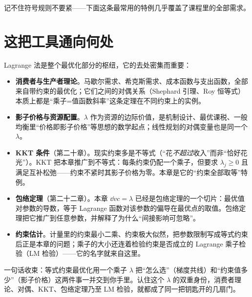 记不住符号规则不要紧——下面这条最常用的特例几乎覆盖了课程里的全部需求。




\section{这把工具通向何处}
\label{sec:lagrange-7}

Lagrange 法是整个最优化部分的枢纽，它的去处密集而重要：

\begin{itemize}
    \item \textbf{消费者与生产者理论}。马歇尔需求、希克斯需求、成本函数与支出函数，全部来自带约束的最优化；它们之间的对偶关系（Shephard 引理、Roy 恒等式）本质上都是``乘子=值函数斜率''这条定理在不同约束上的实例。
    \item \textbf{影子价格与资源配置}。$\lambda$ 作为资源的边际价值，是机制设计、最优课税、一般均衡里``价格即影子价格''等思想的数学起点；线性规划的对偶变量也是同一个 $\lambda$。
    \item \textbf{KKT 条件}（第二十章）。现实约束多是不等式（``花\emph{不超过}收入''而非``恰好花光''）。KKT 把本章推广到不等式：每条约束仍配一个乘子，但要求 $\lambda_j\ge0$ 且满足互补松弛——约束不紧时其影子价格为零。本章是它的``约束全部取等''特例。
    \item \textbf{包络定理}（第二十二章）。本章 $\dd{v}{c}=\lambda$ 已经是包络定理的一个切片：最优值对参数的导数，等于 Lagrange 函数对该参数的偏导在最优点的取值。包络定理把它推广到任意参数，并解释了为什么``间接影响可忽略''。
    \item \textbf{约束估计}。计量里的约束最小二乘、约束极大似然，把参数限制写成等式约束后正是本章的问题；乘子的大小还连着检验约束是否成立的 Lagrange 乘子检验（LM 检验）——它的名字就来自这里。
\end{itemize}

一句话收束：等式约束最优化用一个乘子 $\lambda$ 把``怎么选''（梯度共线）和``约束值多少''（影子价格）这两件事一并交到你手里。认住这个 $\lambda$ 的双重身份，消费者理论、对偶、KKT、包络定理乃至 LM 检验，就都成了同一把钥匙开的几扇门。
